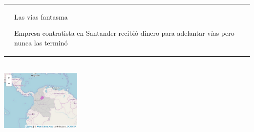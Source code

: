\documentclass[letterpaper]{article}
\renewcommand{\arraystretch}{0}
\begin{document}
\begin{table}[h!]
 \setlength{\tabcolsep}{0pt}
\def\arraystretch{0}
  \begin{tabular}{m{4cm}m{12cm}}

    &
    \vspace{10pt} 

                \begin{center}
        \begin{ejbi-title}
        Las vías fantasma
        \end{ejbi-title}
        \end{center}
                      \begin{center}
      \begin{ejbi-subtitle}
      Empresa contratista en Santander recibió dinero para adelantar vías pero
      nunca las terminó
      \end{ejbi-subtitle}
      \end{center}
        \end{tabular}
\end{table}




\vspace{0.5cm}

\begin{center}\includegraphics[width=150px,height=150px]{built_report_files/figure-latex/unnamed-chunk-3-1} \end{center}
  

  
\vspace{0.5cm}
\end{document}
